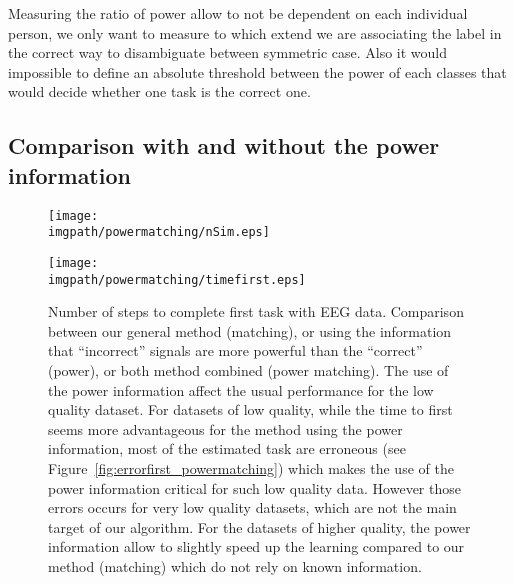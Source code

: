 
Measuring the ratio of power allow to not be dependent on each individual person, we only want to measure to which extend we are associating the label in the correct way to disambiguate between symmetric case. Also it would impossible to define an absolute threshold between the power of each classes that would decide whether one task is the correct one.


\subsection{Comparison with and without the power information}













\begin{figure}[!ht]
\centering
\texttt{[image: \\imgpath/powermatching/nSim.eps]}
\caption{}
\label{fig:nSim_powermatching}
\end{figure} 


\begin{figure}[!ht]
\centering
\texttt{[image: \\imgpath/powermatching/timefirst.eps]}
\caption{Number of steps to complete first task with EEG data. Comparison between our general method (matching), or using the information that ``incorrect'' signals are more powerful than the ``correct'' (power), or both method combined (power matching). The use of the power information affect the usual performance for the low quality dataset. For datasets of low quality, while the time to first seems more advantageous for the method using the power information, most of the estimated task are erroneous (see Figure~\ref{fig:errorfirst_powermatching}) which makes the use of the power information critical for such low quality data. However those errors occurs for very low quality datasets, which are not the main target of our algorithm. For the datasets of higher quality, the power information allow to slightly speed up the learning compared to our method (matching) which do not rely on known information.}
\label{fig:timefirst_powermatching}
\end{figure} 


